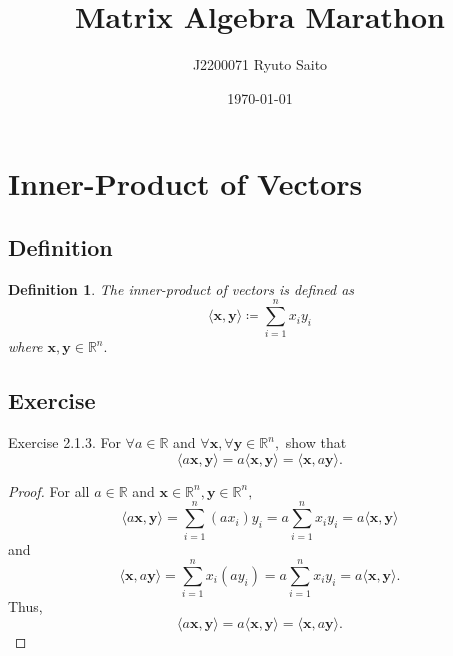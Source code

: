 \documentclass{article}
\title{Matrix Algebra Marathon}
\author{J2200071 Ryuto Saito}
\date{\today}
\theoremstyle{plain}
\newtheorem{dfn}{Definition}[subsection]
\begin{document}
\maketitle

\section{Inner-Product of Vectors}

\subsection{Definition}

\begin{dfn}
  The inner-product of vectors is defined as
  \begin{equation}
    \label{def_inner}
    \langle \bm{x} , \bm{y} \rangle \coloneq \sum_{i=1}^n x_i y_i
  \end{equation}
  where
  \begin{math}
    \bm{x} , \bm{y} \in \mathbb{R}^n .
  \end{math}
\end{dfn}


\subsection{Exercise}

\begin{itembox}[l]{Exercise 2.1.3.}
  For
  \begin{math}
    \forall a \in \mathbb{R}
  \end{math}
  and
  \begin{math}
    \forall \bm{x} , \forall \bm{y} \in \mathbb{R}^n ,
  \end{math}
  show that
  \begin{equation}
    \label{ex213}
    \langle a \bm{x} , \bm{y} \rangle = a \langle \bm{x} , \bm{y} \rangle = \langle \bm{x} , a \bm{y} \rangle .
  \end{equation}
\end{itembox}

\begin{proof}
  For all
  \begin{math}
    a \in \mathbb{R}
  \end{math}
  and
  \begin{math}
    \bm{x} \in \mathbb{R}^n , \bm{y} \in \mathbb{R}^n ,
  \end{math}
  \begin{equation*}
    \langle a \bm{x} , \bm{y} \rangle = \sum_{i=1}^n (a x_i) y_i = a \sum_{i=1}^n x_i y_i = a \langle \bm{x} , \bm{y} \rangle
  \end{equation*}
  and
  \begin{equation*}
    \langle \bm{x} , a \bm{y} \rangle = \sum_{i=1}^n x_i (a y_i) = a \sum_{i=1}^n x_i y_i = a \langle \bm{x} , \bm{y} \rangle .
  \end{equation*}
  Thus,
  \begin{equation*}
    \langle a \bm{x} , \bm{y} \rangle = a \langle \bm{x} , \bm{y} \rangle = \langle \bm{x} , a \bm{y} \rangle .
  \end{equation*}
\end{proof}
\end{document}
